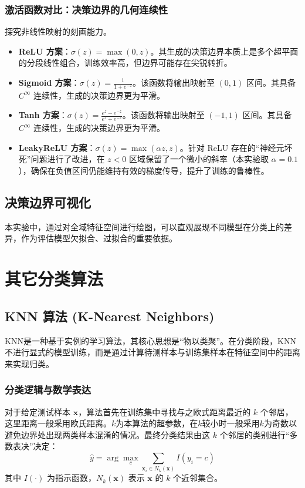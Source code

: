 \subsubsection{激活函数对比：决策边界的几何连续性}
探究非线性映射的刻画能力。
\begin{itemize}
	\item \textbf{ReLU 方案}：$ \sigma(z) = \max(0, z) $。其生成的决策边界本质上是多个超平面的分段线性组合，训练效率高，但边界可能存在尖锐转折。
	
	\item \textbf{Sigmoid 方案}：$ \sigma(z) = \frac{1}{1 + e^{-z}} $。该函数将输出映射至 $ (0, 1) $ 区间。其具备 $ C^\infty $ 连续性，生成的决策边界更为平滑。
	
	\item \textbf{Tanh 方案}：$ \sigma(z) = \frac{e^z - e^{-z}}{e^z + e^{-z}} $。该函数将输出映射至 $ (-1, 1) $ 区间。其具备 $ C^\infty $ 连续性，生成的决策边界更为平滑。
	
	\item \textbf{LeakyReLU 方案}：$ \sigma(z) = \max(\alpha z, z) $。针对 ReLU 存在的“神经元坏死”问题进行了改进，在 $ z < 0 $ 区域保留了一个微小的斜率（本实验取 $ \alpha = 0.1 $），确保在负值区间仍能维持有效的梯度传导，提升了训练的鲁棒性。
	
\end{itemize}

\subsection{决策边界可视化}

本实验中，通过对全域特征空间进行绘图，可以直观展现不同模型在分类上的差异，作为评估模型欠拟合、过拟合的重要依据。

\section{其它分类算法}

\subsection{KNN 算法 (K-Nearest Neighbors)}

KNN是一种基于实例的学习算法，其核心思想是“物以类聚”。在分类阶段，KNN 不进行显式的模型训练，而是通过计算待测样本与训练集样本在特征空间中的距离来实现归类。

\subsubsection{分类逻辑与数学表达}
对于给定测试样本 $\mathbf{x}$，算法首先在训练集中寻找与之欧式距离最近的 $k$ 个邻居，这里距离一般采用欧氏距离。$k$为本算法的超参数，在$k$较小时一般采用$k$为奇数以避免边界处出现两类样本混淆的情况。最终分类结果由这 $k$ 个邻居的类别进行“多数表决”决定：$$\hat{y} = \arg \max_{c} \sum_{\mathbf{x}_i \in N_k(\mathbf{x})} I(y_i = c)$$其中 $I(\cdot)$ 为指示函数，$N_k(\mathbf{x})$ 表示 $\mathbf{x}$ 的 $k$ 个近邻集合。

